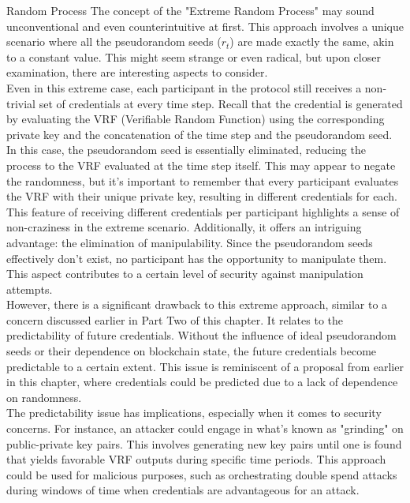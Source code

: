 \subsectionExtreme Random Process{}
The concept of the "Extreme Random Process" may sound unconventional and even counterintuitive at first. This approach involves a unique scenario where all the pseudorandom seeds ($r_t$) are made exactly the same, akin to a constant value. This might seem strange or even radical, but upon closer examination, there are interesting aspects to consider.\\
Even in this extreme case, each participant in the protocol still receives a non-trivial set of credentials at every time step. Recall that the credential is generated by evaluating the VRF (Verifiable Random Function) using the corresponding private key and the concatenation of the time step and the pseudorandom seed. In this case, the pseudorandom seed is essentially eliminated, reducing the process to the VRF evaluated at the time step itself. This may appear to negate the randomness, but it's important to remember that every participant evaluates the VRF with their unique private key, resulting in different credentials for each.\\
This feature of receiving different credentials per participant highlights a sense of non-craziness in the extreme scenario. Additionally, it offers an intriguing advantage: the elimination of manipulability. Since the pseudorandom seeds effectively don't exist, no participant has the opportunity to manipulate them. This aspect contributes to a certain level of security against manipulation attempts.\\
However, there is a significant drawback to this extreme approach, similar to a concern discussed earlier in Part Two of this chapter. It relates to the predictability of future credentials. Without the influence of ideal pseudorandom seeds or their dependence on blockchain state, the future credentials become predictable to a certain extent. This issue is reminiscent of a proposal from earlier in this chapter, where credentials could be predicted due to a lack of dependence on randomness.\\
The predictability issue has implications, especially when it comes to security concerns. For instance, an attacker could engage in what's known as "grinding" on public-private key pairs. This involves generating new key pairs until one is found that yields favorable VRF outputs during specific time periods. This approach could be used for malicious purposes, such as orchestrating double spend attacks during windows of time when credentials are advantageous for an attack.\\
